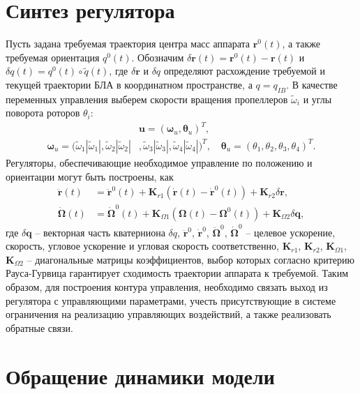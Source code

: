 \section{Синтез регулятора}

Пусть задана требуемая траектория центра масс аппарата $\bm r^0(t)$, а также требуемая ориентация $q^0(t)$. Обозначим  $\delta \bm r(t) = \bm r^0(t) - \bm r(t)$ и $\delta q(t) = q^0(t) \circ \tilde q(t)$, где $\delta \bm r$ и $\delta q$ определяют расхождение требуемой и текущей траектории БЛА в координатном пространстве, а $q = q_{IB}$.  В качестве переменных управления выберем скорости вращения пропеллеров ${\tilde \omega}_i$ и углы поворота роторов ${\theta}_i$:
\begin{equation} \label{eq:m_ctrl_out}
\begin{aligned}
	&\bm{u} = (\bm \omega_u, \bm \theta_u)^T,
	\\
	\bm \omega_u =
	(\tilde\omega_1 |\tilde\omega_1|,
	\tilde\omega_2 |\tilde\omega_2|&,
	\tilde\omega_3 |\tilde\omega_3|,
	\tilde\omega_4 |\tilde\omega_4|)^T,
	\quad
	\bm \theta_u = (\theta_1, \theta_2 , \theta_3 , \theta_4 )^T.
\end{aligned}
\end{equation}
Регуляторы, обеспечивающие необходимое управление по положению и ориентации могут быть построены, как
\begin{equation} \label{eq:m_reg}
\begin{aligned}
	\ddot{\bm{r}}(t)&=
	\ddot{\bm{r}}^0(t)+\bm{K}_{r1}(\dot{\bm{r}}(t)-\dot{\bm{r}}^0(t))+\bm{K}_{r2}\delta \bm r,\\
	\dot{\bm{\Omega}}(t)&=
	\dot{\bm{\Omega}}^0(t)+\bm{K}_{\Omega1}(\bm{\Omega}(t)-\bm{\Omega}^0(t))+\bm{K}_{\Omega2}\delta\bm{q},
\end{aligned}
\end{equation}
где $\delta \bm q$ -- векторная часть кватерниона $\delta q$,
$\ddot{\bm{r}}^0$, $\dot{\bm{r}}^0$, $\ddot{\bm{\Omega}}^0$, $\dot{\bm{\Omega}}^0$ -- целевое ускорение, скорость, угловое ускорение и угловая скорость соответственно,
$\bm K_{r1}$, $\bm K_{r2}$, $\bm K_{\Omega1}$, $\bm K_{\Omega2}$ -- диагональные матрицы коэффициентов, выбор которых согласно критерию Рауса-Гурвица гарантирует сходимость траектории аппарата к требуемой. Таким образом, для построения
контура управления, необходимо связать выход из регулятора с управляющими
параметрами, учесть присутствующие в системе ограничения на реализацию
управляющих воздействий, а также реализовать обратные связи.

\section{Обращение динамики модели}

